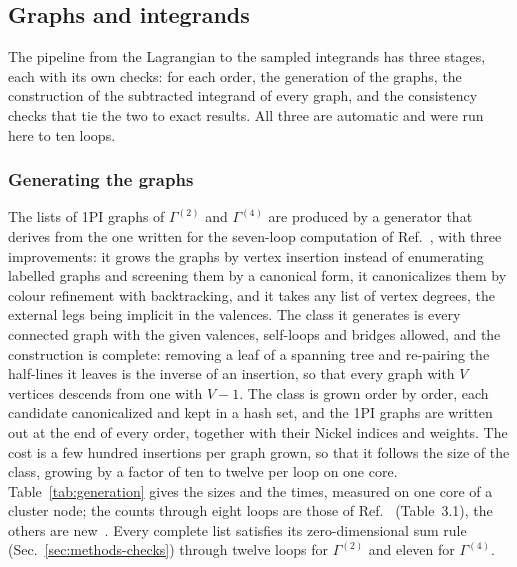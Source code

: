 \subsection{Graphs and integrands}
\label{sec:methods-graphs}

The pipeline from the Lagrangian to the sampled integrands has three stages, each with its own checks: for each order, the generation
of the graphs, the construction of the subtracted integrand of every graph, and the consistency checks that
tie the two to exact results. All three are automatic and were run here to ten loops.

\subsubsection{Generating the graphs}
\label{sec:methods-generation}

The lists of 1PI graphs of $\Gamma^{(2)}$ and $\Gamma^{(4)}$ are produced by a generator that derives from the one
written for the seven-loop computation of Ref.~\cite{Ribeca2003thesis}, with three improvements: it grows the graphs
by vertex insertion instead of enumerating labelled graphs and screening them by a canonical form, it canonicalizes
them by colour refinement with backtracking, and it takes any list of vertex degrees, the external legs being implicit
in the valences. The class it generates is every connected graph with the given valences, self-loops and bridges
allowed, and the construction is complete: removing a leaf of a spanning tree and re-pairing the half-lines it leaves
is the inverse of an insertion, so that every graph with $V$ vertices descends from one with $V-1$. The class
is grown order by order, each candidate canonicalized and kept in a hash set, and the 1PI graphs are written out at
the end of every order, together with their Nickel indices and weights. The cost is a few hundred insertions per
graph grown, so that it follows the size of the class, growing by a factor of ten to twelve per loop on one core.
Table~\ref{tab:generation} gives the sizes and the times, measured on one core of a cluster node; the
counts through eight loops are those of Ref.~\cite{Ribeca2003thesis} (Table~3.1), the others are new~. Every
complete list satisfies its zero-dimensional sum rule (Sec.~\ref{sec:methods-checks}) through twelve loops for
$\Gamma^{(2)}$ and eleven for $\Gamma^{(4)}$.

